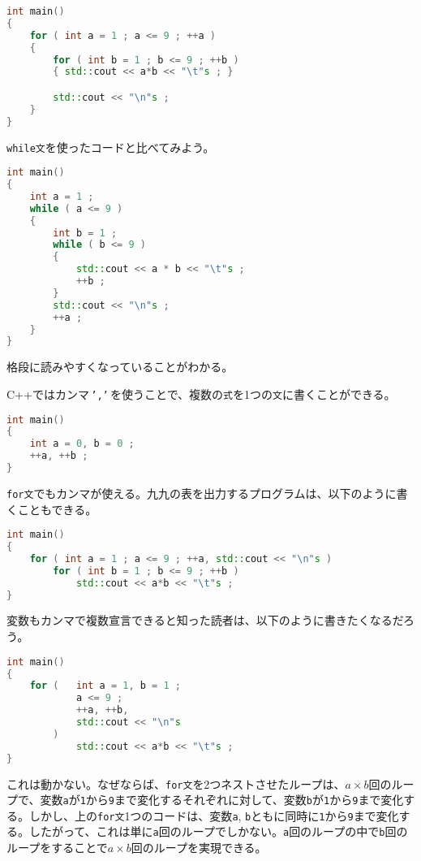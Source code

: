 \ifTombow\pagebreak\fi
\begin{lstlisting}[language={C++}]
int main()
{
    for ( int a = 1 ; a <= 9 ; ++a )
    {
        for ( int b = 1 ; b <= 9 ; ++b )
        { std::cout << a*b << "\t"s ; }

        std::cout << "\n"s ;
    }
}
\end{lstlisting}

\texttt{while文}を使ったコードと比べてみよう。

\begin{lstlisting}[language={C++}]
int main()
{
    int a = 1 ;
    while ( a <= 9 )
    {
        int b = 1 ;
        while ( b <= 9 )
        {
            std::cout << a * b << "\t"s ;
            ++b ;
        }
        std::cout << "\n"s ;
        ++a ;
    }
}
\end{lstlisting}

格段に読みやすくなっていることがわかる。

C++ではカンマ\,\texttt{','}\,を使うことで、複数の\texttt{式}を1つの\texttt{文}に書くことができる。

\begin{lstlisting}[language={C++}]
int main()
{
    int a = 0, b = 0 ;
    ++a, ++b ;
}
\end{lstlisting}

\texttt{for文}でもカンマが使える。九九の表を出力するプログラムは、以下のように書くこともできる。

\ifTombow\pagebreak\fi
\begin{lstlisting}[language={C++}]
int main()
{
    for ( int a = 1 ; a <= 9 ; ++a, std::cout << "\n"s )
        for ( int b = 1 ; b <= 9 ; ++b )
            std::cout << a*b << "\t"s ;
}
\end{lstlisting}

変数もカンマで複数宣言できると知った読者は、以下のように書きたくなるだろう。

\begin{lstlisting}[language={C++}]
int main()
{
    for (   int a = 1, b = 1 ;
            a <= 9 ;
            ++a, ++b,
            std::cout << "\n"s
        )
            std::cout << a*b << "\t"s ;
}
\end{lstlisting}

これは動かない。なぜならば、\texttt{for文}を2つネストさせたループは、\(a \times b\)回のループで、変数\texttt{a}が\texttt{1}から\texttt{9}まで変化するそれぞれに対して、変数\texttt{b}が\texttt{1}から\texttt{9}まで変化する。しかし、上の\texttt{for文}1つのコードは、変数\texttt{a}, \texttt{b}ともに同時に\texttt{1}から\texttt{9}まで変化する。したがって、これは単に\texttt{a}回のループでしかない。\texttt{a}回のループの中で\texttt{b}回のループをすることで\(a \times b\)回のループを実現できる。


